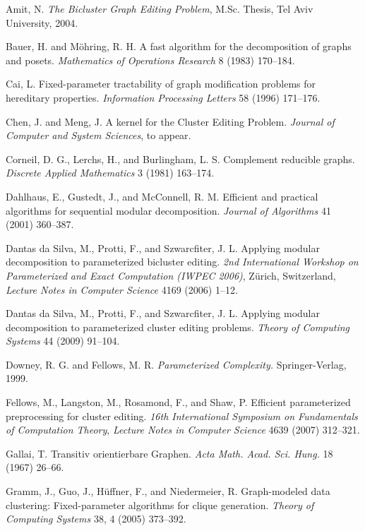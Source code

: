 \documentclass[12pt]{article}
\begin{document}
\begin{thebibliography}{99}

Amit, N. \emph{The Bicluster Graph Editing Problem}, M.Sc. Thesis,
Tel Aviv University, 2004.

Bauer, H. and M\"ohring, R. H. A fast algorithm for the decomposition of graphs and posets.
{\em Mathematics of Operations Research} 8 (1983) 170--184.

Cai, L. Fixed-parameter tractability of graph modification
problems for hereditary properties. {\em Information Processing
Letters} 58 (1996) 171--176.

Chen, J. and Meng, J. A  kernel for the Cluster Editing Problem.
{\em Journal of Computer and System Sciences}, to appear.

Corneil, D. G., Lerchs, H., and Burlingham, L. S. Complement
reducible graphs. {\em Discrete Applied Mathematics} 3 (1981)
163--174.

Dahlhaus, E., Gustedt, J., and McConnell, R. M. Efficient and practical algorithms for sequential modular decomposition. {\em Journal of Algorithms} 41 (2001) 360--387.

Dantas da Silva, M., Protti, F., and Szwarcfiter, J. L.
Applying modular decomposition to parameterized bicluster editing.
{\em 2nd International Workshop on Parameterized and Exact Computation (IWPEC 2006)}, Z\"{u}rich, Switzerland,
{\em Lecture Notes in Computer Science} 4169 (2006) 1--12.

Dantas da Silva, M., Protti, F., and Szwarcfiter, J. L.
Applying modular decomposition to parameterized cluster editing problems.
{\em Theory of Computing Systems} 44 (2009) 91--104.

Downey, R. G. and Fellows, M. R.
\emph{Parameterized Complexity.} Springer-Verlag, 1999.

Fellows, M., Langston, M., Rosamond, F., and Shaw, P. Efficient
parameterized preprocessing for cluster editing.
\emph{16th International Symposium on Fundamentals of Computation Theory}, \emph{Lecture Notes in
Computer Science} 4639 (2007) 312--321.

Gallai, T. Transitiv orientierbare Graphen.
{\em Acta Math. Acad. Sci. Hung.} 18 (1967) 26--66.

Gramm, J., Guo, J., H\"uffner, F., and Niedermeier, R. Graph-modeled
data clustering: Fixed-parameter algorithms for clique generation.
{\em Theory of Computing Systems} 38, 4 (2005) 373--392.


\end{thebibliography}
\end{document}
